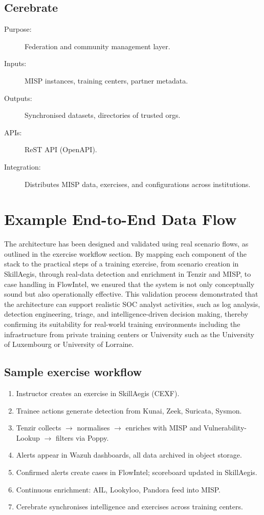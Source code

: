 \documentclass[10pt,a4paper]{report}
\begin{document}
\subsection{Cerebrate}
\begin{description}
  \item[Purpose:] Federation and community management layer.
  \item[Inputs:] MISP instances, training centers, partner metadata.
  \item[Outputs:] Synchronised datasets, directories of trusted orgs.
  \item[APIs:] ReST API (OpenAPI).
  \item[Integration:] Distributes MISP data, exercises, and configurations
  across institutions.
\end{description}

\section{Example End-to-End Data Flow}
The architecture has been designed and validated using real scenario flows,
as outlined in the exercise workflow section. By mapping each component of
the stack to the practical steps of a training exercise, from scenario
creation in SkillAegis, through real-data detection and enrichment in Tenzir
and MISP, to case handling in FlowIntel, we ensured that the system is not
only conceptually sound but also operationally effective. This validation
process demonstrated that the architecture can support realistic SOC analyst
activities, such as log analysis, detection engineering, triage, and
intelligence-driven decision making, thereby confirming its suitability for
real-world training environments including the infrastructure from private
training centers or University such as the University of Luxembourg or
University of Lorraine.

\subsection{Sample exercise workflow}

\begin{enumerate}
    \item Instructor creates an exercise in SkillAegis (CEXF).
    \item Trainee actions generate detection from Kunai, Zeek, Suricata,
          Sysmon.
    \item Tenzir collects $\to$ normalises $\to$ enriches with MISP and
          Vulnerability-Lookup $\to$ filters via Poppy.
    \item Alerts appear in Wazuh dashboards, all data archived in object storage.
    \item Confirmed alerts create cases in FlowIntel; scoreboard updated in
          SkillAegis.
    \item Continuous enrichment: AIL, Lookyloo, Pandora feed into MISP.
    \item Cerebrate synchronises intelligence and exercises across training
          centers.
\end{enumerate}
\end{document}
